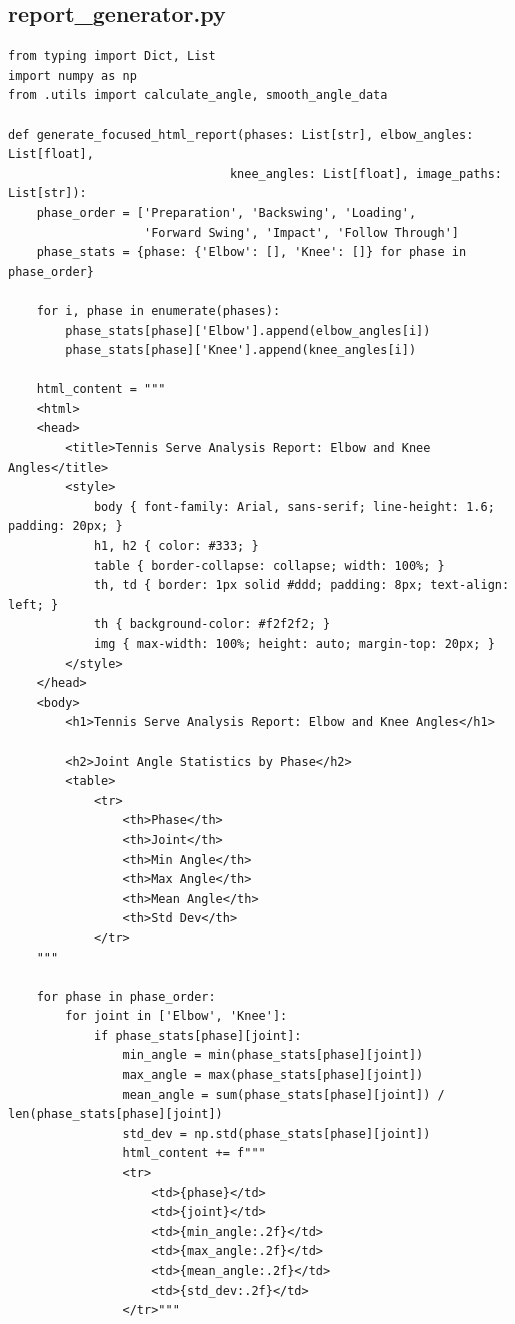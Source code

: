 \documentclass[oneside]{suribt}[11pt]
\begin{document}
\subsection{report\_generator.py}
\begin{lstlisting}
from typing import Dict, List
import numpy as np
from .utils import calculate_angle, smooth_angle_data

def generate_focused_html_report(phases: List[str], elbow_angles: List[float], 
                               knee_angles: List[float], image_paths: List[str]):
    phase_order = ['Preparation', 'Backswing', 'Loading', 
                   'Forward Swing', 'Impact', 'Follow Through']
    phase_stats = {phase: {'Elbow': [], 'Knee': []} for phase in phase_order}
    
    for i, phase in enumerate(phases):
        phase_stats[phase]['Elbow'].append(elbow_angles[i])
        phase_stats[phase]['Knee'].append(knee_angles[i])
    
    html_content = """
    <html>
    <head>
        <title>Tennis Serve Analysis Report: Elbow and Knee Angles</title>
        <style>
            body { font-family: Arial, sans-serif; line-height: 1.6; padding: 20px; }
            h1, h2 { color: #333; }
            table { border-collapse: collapse; width: 100%; }
            th, td { border: 1px solid #ddd; padding: 8px; text-align: left; }
            th { background-color: #f2f2f2; }
            img { max-width: 100%; height: auto; margin-top: 20px; }
        </style>
    </head>
    <body>
        <h1>Tennis Serve Analysis Report: Elbow and Knee Angles</h1>

        <h2>Joint Angle Statistics by Phase</h2>
        <table>
            <tr>
                <th>Phase</th>
                <th>Joint</th>
                <th>Min Angle</th>
                <th>Max Angle</th>
                <th>Mean Angle</th>
                <th>Std Dev</th>
            </tr>
    """
    
    for phase in phase_order:
        for joint in ['Elbow', 'Knee']:
            if phase_stats[phase][joint]:
                min_angle = min(phase_stats[phase][joint])
                max_angle = max(phase_stats[phase][joint])
                mean_angle = sum(phase_stats[phase][joint]) / len(phase_stats[phase][joint])
                std_dev = np.std(phase_stats[phase][joint])
                html_content += f"""
                <tr>
                    <td>{phase}</td>
                    <td>{joint}</td>
                    <td>{min_angle:.2f}</td>
                    <td>{max_angle:.2f}</td>
                    <td>{mean_angle:.2f}</td>
                    <td>{std_dev:.2f}</td>
                </tr>"""
    

\end{lstlisting}
\end{document}
